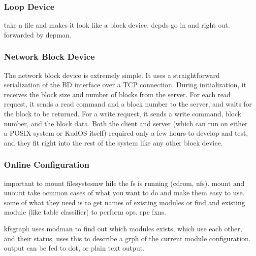 \subsubsection{Loop Device}
\label{sec:soln:impl:loop}

take a file and makes it look like a block device. depds go in and
right out. forwarded by depman.

\subsubsection{Network Block Device}

The network block device is extremely simple. It uses a straightforward
serialization of the BD interface over a TCP connection. During initialization,
it receives the block size and number of blocks from the server. For each read
request, it sends a read command and a block number to the server, and waits for
the block to be returned. For a write request, it sends a write command, block
number, and the block data. Both the client and server (which can run on either
a POSIX system or KudOS itself) required only a few hours to develop and test,
and they fit right into the rest of the system like any other block device.

\subsubsection{Online Configuration}
\label{sec:soln:impl:onlineconfig}


important to mount filesystesmw hile the fs is running (cdrom,
nfs). mount and unount take ocmmon cases of what you want to do and
make them easy to use. some of what they need is to get names of
existing modules or find and existing module (like table classifier)
to perform ops. rpc fxns.

kfsgraph uses modman to find out which modules exists, which use each
other, and their status. uses this to describe a grph of the current
module configuration. output can be fed to dot, or plain text output.

